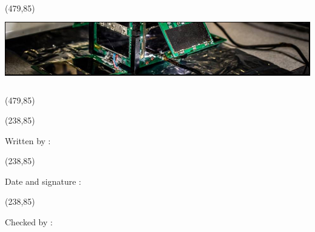 		
		\begin{center}
			\framebox(479,85){\includegraphics[height=85pt]{media/banner}}\\
			\vspace{0.3cm}
			
			\framebox(479,85){ \hfill\begin{minipage}[]{16.5cm}
					\hfill\textbf{\ONEteam}
					\hfill\flushright\large\textbf{\textcolor{bleuONE}{\ONEtitle}}
					\flushright \normalsize \textbf{\hfill \textcolor{gray}{\ONEdate}}
				\end{minipage} }
		\end{center}
		\framebox(238,85){\begin{minipage}[]{10cm}
				\begin{center}
					Written by :\\
					\ONEauthor
					\vspace{0.5cm}
					
				\end{center}
				
				
				
		\end{minipage}}
	\framebox(238,85){\begin{minipage}[]{10cm}
			\begin{center}
				Date and signature :\\
				\vspace{1cm}
			
			
		\end{center}
			
	\end{minipage}}
\noindent
	\framebox(238,85){\begin{minipage}[]{10cm}
			\begin{center}
				Checked  by :\\
				\ONEchecker
				\vspace{0.5cm}
				
			\end{center}
			
			
			
	\end{minipage}}
